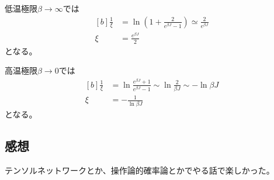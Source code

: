 \documentclass[../../sp_2018.tex]{subfiles}
\begin{document}
低温極限\(\beta\to \infty\)では
\begin{equation}\begin{aligned}[b]
    \frac{1}{\xi} &= \ln(1+\frac{2}{e^{\beta J}-1}) \simeq \frac{2}{e^{\beta J}}\\
    \xi &= \frac{e^{\beta J}}{2}
\end{aligned}\end{equation}
となる。

高温極限\(\beta\to 0\)では
\begin{equation}\begin{aligned}[b]
    \frac{1}{\xi} &= \ln\frac{e^{\beta J}+1}{e^{\beta J}-1} \sim \ln\frac{2}{\beta J}\sim -\ln\beta J\\
    \xi &= -\frac{1}{\ln\beta J}
\end{aligned}\end{equation}
となる。


\subsection*{感想}
テンソルネットワークとか、操作論的確率論とかでやる話で楽しかった。
\end{document}

